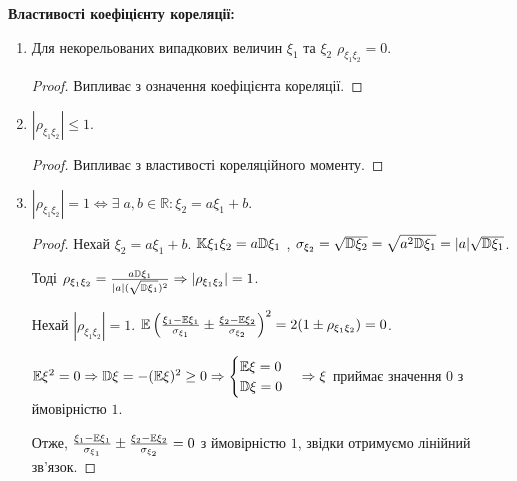 \noindent \textbf{Властивості коефіцієнту кореляції:}
\begin{enumerate}
    \item Для некорельованих випадкових величин $\xi_1$ та $\xi_2$ 
    $\rho_{\xi_1\xi_2} = 0$.
    \begin{proof}
        Випливає з означення коефіцієнта кореляції.
    \end{proof}
    \item $\left|\rho_{\xi_1\xi_2}\right| \leq 1$.
    \begin{proof}
        Випливає з властивості  кореляційного моменту.
    \end{proof}
    \item $\left|\rho_{\xi_1\xi_2}\right| = 1 \Leftrightarrow 
    \exists \; a, b \in \mathbb{R}: \xi_2 = a\xi_1 + b$.
    \begin{proof}
        Нехай 
        $\xi_2 = a\xi_1 + b$. $\mathbb{K}\xi_1\xi_2 = 
        a\mathbb{D}\xi_1$
        , 
        $\sigma_{\xi_2} = \sqrt{\mathbb{D}\xi_2} = \sqrt{a^2\mathbb{D}\xi_1} = 
        |a|\sqrt{\mathbb{D}\xi_1}$.

        Тоді $\rho_{\xi_1\xi_2} = \frac{a\mathbb{D}\xi_1}{|a|(\sqrt{\mathbb{D}\xi_1})^2} 
        \Rightarrow
        \left|\rho_{\xi_1\xi_2}\right| = 1$.

        Нехай $\left|\rho_{\xi_1\xi_2}\right| = 1$.
        $\mathbb{E}\left(\frac{\xi_1 - \mathbb{E}\xi_1}{\sigma_{\xi_1}} 
        \pm \frac{\xi_2 - \mathbb{E}\xi_2}{\sigma_{\xi_2}}\right)^2 = 
        2(1\pm\rho_{\xi_1\xi_2}) = 0$.

        $\mathbb{E}\xi^2 = 0 \Rightarrow \mathbb{D}\xi = -(\mathbb{E}\xi)^2 \geq 0 \Rightarrow \begin{cases}
            \mathbb{E}\xi = 0 \\ \mathbb{D}\xi = 0
        \end{cases} \Rightarrow \xi$ приймає значення $0$ з ймовірністю $1$.

        Отже, $\frac{\xi_1 - \mathbb{E}\xi_1}{\sigma_{\xi_1}} 
        \pm \frac{\xi_2 - \mathbb{E}\xi_2}{\sigma_{\xi_2}} = 0$ з ймовірністю $1$,
        звідки отримуємо лінійний зв'язок.
    \end{proof}
\end{enumerate}
